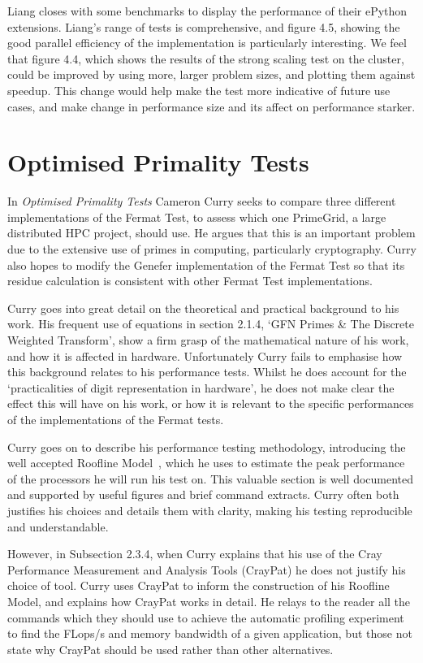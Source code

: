 \documentclass{report}[a4]
\begin{document}
 Liang closes with some benchmarks to display the performance of their ePython extensions. Liang's range of tests is comprehensive, and figure 4.5, showing the good parallel efficiency of the implementation is particularly interesting. We feel that figure 4.4, which shows the results of the strong scaling test on the cluster, could be improved by using more, larger problem sizes, and plotting them against speedup. This change would help make the test more indicative of future use cases, and make change in performance size and its affect on performance starker.

\section{Optimised Primality Tests}

In \textit{Optimised Primality Tests} Cameron Curry seeks to compare three different implementations of the Fermat Test, to assess which one PrimeGrid, a large distributed HPC project, should use. He argues that this is an important problem due to the extensive use of primes in computing, particularly cryptography. Curry also hopes to modify the Genefer implementation of the Fermat Test so that its residue calculation is consistent with other Fermat Test implementations.

Curry goes into great detail on the theoretical and practical background to his work. His frequent use of equations in section 2.1.4, `GFN Primes \& The Discrete Weighted Transform', show a firm grasp of the mathematical nature of his work, and how it is affected in hardware. Unfortunately Curry fails to emphasise how this background relates to his performance tests.  Whilst he does account for the `practicalities of digit representation in hardware', he does not make clear the effect this will have on his work, or how it is relevant to the specific performances of the implementations of the Fermat tests.

Curry goes on to describe his performance testing methodology, introducing the well accepted Roofline Model~\cite{williams2009, hennessy2011computer, asanovic2009view}, which he uses to estimate the peak performance of the processors he will run his test on. This valuable section is well documented and supported by useful figures and brief command extracts. Curry often both justifies his choices and details them with clarity, making his testing reproducible and understandable.

However, in Subsection 2.3.4, when Curry explains that his use of the Cray Performance Measurement and Analysis Tools (CrayPat) he does not justify his choice of tool. Curry uses CrayPat to inform the construction of his Roofline Model, and explains how CrayPat works in detail. He relays to the reader all  the commands which they should use to achieve the automatic profiling experiment to find the FLops/s and memory bandwidth of a given application, but those not state why CrayPat should be used rather than other alternatives.
\end{document}
